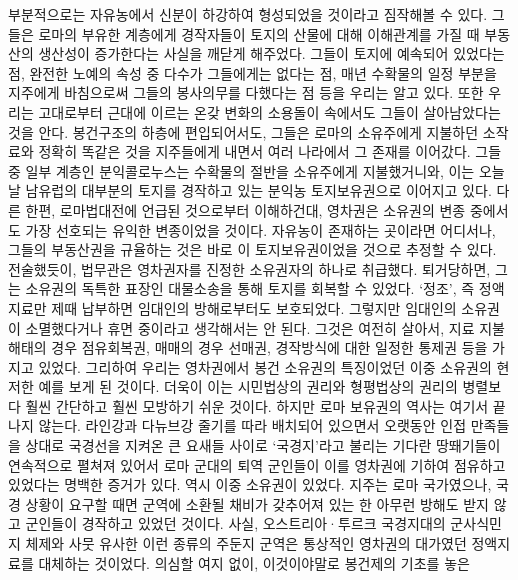 부분적으로는 자유농에서 신분이 하강하여
형성되었을 것이라고 짐작해볼 수 있다.
그들은 로마의 부유한 계층에게
경작자들이 토지의 산물에 대해 이해관계를 가질 때
부동산의 생산성이 증가한다는 사실을
깨닫게 해주었다.
그들이 토지에 예속되어 있었다는 점,
완전한 노예의 속성 중 다수가 그들에게는 없다는 점,
매년 수확물의 일정 부분을 지주에게 바침으로써 그들의 봉사의무를
다했다는 점 등을
우리는 알고 있다.
또한 우리는 고대로부터 근대에 이르는 온갖 변화의 소용돌이 속에서도
그들이 살아남았다는 것을 안다.
봉건구조의 하층에 편입되어서도,
그들은 로마의 소유주에게 지불하던 소작료와 정확히
똑같은 것을 지주들에게 내면서 여러 나라에서 그 존재를 이어갔다.
그들 중 일부 계층인
분익콜로누스는
수확물의 절반을 소유주에게 지불했거니와,
이는
오늘날 남유럽의 대부분의 토지를 경작하고 있는
분익농 토지보유권으로 이어지고 있다.
다른 한편,
로마법대전에 언급된 것으로부터 이해하건대,
영차권은
소유권의 변종 중에서도
가장 선호되는 유익한 변종이었을 것이다.
자유농이 존재하는 곳이라면 어디서나,
그들의 부동산권을 규율하는 것은 바로 이 토지보유권이었을 것으로 추정할 수 있다.
전술했듯이, 법무관은 영차권자를
진정한 소유권자의 하나로 취급했다.
퇴거당하면, 그는
소유권의 독특한 표장인
대물소송을 통해 토지를 회복할 수 있었다.
`정조',
즉 정액지료만
제때 납부하면 임대인의 방해로부터도 보호되었다.
그렇지만 임대인의 소유권이
소멸했다거나 휴면 중이라고 생각해서는 안 된다.
그것은 여전히 살아서,
지료 지불 해태의 경우 점유회복권,
매매의 경우 선매권,
경작방식에 대한 일정한 통제권 등을 가지고 있었다.
그리하여 우리는 영차권에서
봉건 소유권의 특징이었던
이중 소유권의 현저한 예를 보게 된 것이다.
더욱이 이는
시민법상의 권리와 형평법상의 권리의 병렬보다
훨씬 간단하고 훨씬 모방하기 쉬운 것이다.
하지만 로마 보유권의 역사는 여기서 끝나지 않는다.
라인강과 다뉴브강 줄기를 따라
배치되어 있으면서
오랫동안
인접 만족들을 상대로
국경선을 지켜온
큰 요새들 사이로
`국경지'라고 불리는
기다란 땅뙈기들이
연속적으로 펼쳐져 있어서
로마 군대의 퇴역 군인들이 이를 영차권에 기하여
점유하고 있었다는
명백한 증거가 있다.
역시 이중 소유권이 있었다.
지주는 로마 국가였으나,
국경 상황이 요구할 때면 군역에 소환될 채비가 갖추어져 있는 한
아무런 방해도 받지 않고
군인들이
경작하고 있었던 것이다.
사실,
오스트리아^^b7투르크 국경지대의 군사식민지 체제와 사뭇 유사한
이런 종류의 주둔지 군역은
통상적인 영차권의 대가였던 정액지료를 대체하는 것이었다.
의심할 여지 없이,
이것이야말로
봉건제의 기초를 놓은

